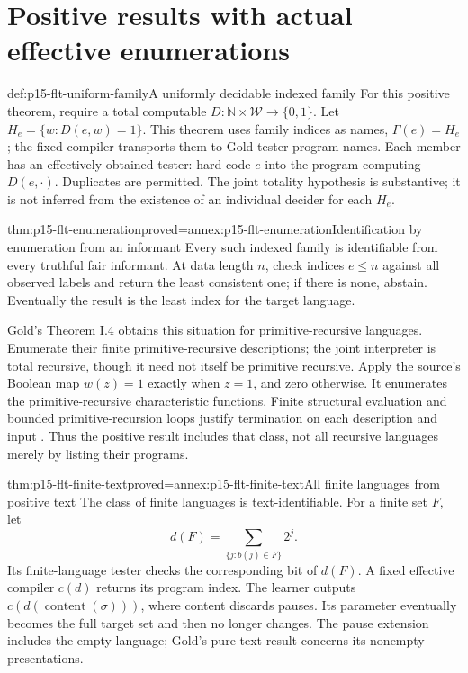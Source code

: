 \section{Positive results with actual effective enumerations}
\label{sec:p15-flt-positive}

\begin{hbdefinition}{def:p15-flt-uniform-family}{A uniformly decidable indexed family}
For this positive theorem, require a total computable
\(D:\mathbb N\times\mathcal W\to\{0,1\}\).
Let \(H_e=\{w:D(e,w)=1\}\).
This theorem uses family indices as names, \(\Gamma(e)=H_e\);
the fixed compiler transports them to Gold tester-program names.
Each member has an effectively obtained tester: hard-code
\(e\) into the program computing \(D(e,\cdot)\).
Duplicates are permitted. The joint totality hypothesis is
substantive; it is not inferred from the existence of
an individual decider for each \(H_e\).
\end{hbdefinition}

\begin{hbtheorem}{thm:p15-flt-enumeration}{proved=annex:p15-flt-enumeration}{Identification by enumeration from an informant}
Every such indexed family is identifiable from every truthful
fair informant. At data length \(n\), check indices
\(e\leq n\) against all observed labels and return the least
consistent one; if there is none, abstain.
Eventually the result is the least index for the target language.
\end{hbtheorem}

Gold's Theorem I.4 obtains this situation for primitive-recursive
languages. Enumerate their finite primitive-recursive descriptions;
the joint interpreter is total recursive, though it need not
itself be primitive recursive. Apply the source's Boolean map
\(w(z)=1\) exactly when \(z=1\), and zero otherwise.
It enumerates the primitive-recursive characteristic functions.
Finite structural evaluation and bounded primitive-recursion
loops justify termination on each description and input
\cite[pp.\ 467--468]{Gold1967IdentificationFLT}.
Thus the positive result includes that class, not all recursive
languages merely by listing their programs.

\begin{hbtheorem}{thm:p15-flt-finite-text}{proved=annex:p15-flt-finite-text}{All finite languages from positive text}
The class of finite languages is text-identifiable.
For a finite set \(F\), let
\[
 d(F)=\sum_{\{j:b(j)\in F\}}2^j.
\]
Its finite-language tester checks the corresponding bit of
\(d(F)\). A fixed effective compiler \(c(d)\) returns its
program index. The learner outputs \(c(d(\operatorname{content}
(\sigma)))\), where content discards pauses.
Its parameter eventually becomes the full target set and
then no longer changes. The pause extension includes the
empty language; Gold's pure-text result concerns its
nonempty presentations.
\end{hbtheorem}

